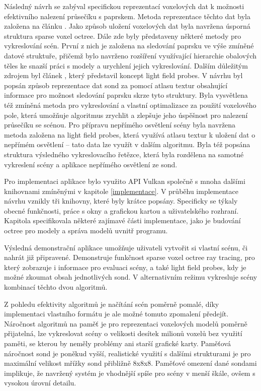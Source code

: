 Následný návrh se zabýval specifickou reprezentací voxelových dat k možnosti efektivního nalezení průsečíku s paprskem. Metoda reprezentace těchto dat byla založena na článku \cite{Laine2011EfficientSV}. Jako způsob uložení voxelových dat byla navržena úsporná struktura sparse voxel octree. Dále zde byly představeny některé metody pro vykreslování scén. První z nich je založena na sledování paprsku ve výše zmíněné datové struktuře, přičemž bylo navrženo rozšíření využívající hierarchie obalových těles ke snazší práci s modely a urychlení jejich vykreslování. Dalším důležitým zdrojem byl článek \cite{light_field_probes}, který představil koncept light field probes. V návrhu byl popsán způsob reprezentace dat sond za pomocí atlasu textur obsahující informace pro možnost sledování paprsku skrze tyto struktury. Byla vysvětlena též zmíněná metoda pro vykreslování a vlastní optimalizace za použití voxelového pole, která umožňuje algoritmus zrychlit a zlepšuje jeho úspěšnost pro nalezení průsečíku se scénou. Pro přípravu nepřímého osvětlení scény byla navržena metoda založena na light field probes, která využívá atlasu textur k uložení dat o nepřímém osvětlení -- tato data lze využít v dalším algoritmu. Byla též popsána struktura výsledného vykreslovacího řetězce, která byla rozdělena na samotné vykreslení scény a aplikace nepřímého osvětlení ze sond.

Pro implementaci aplikace bylo využito API Vulkan společně s mnoha dalšími knihovnami zmíněnými v kapitole \ref{implementace}. V průběhu implementace návrhu vznikly tři knihovny, které byly krátce popsány. Specificky se týkaly obecné funkčnosti, práce s okny a grafickou kartou a uživatelského rozhraní. Kapitola specifikovala některé zajímavé části implementace, jako je budování octree pro modely a správa modelů uvnitř programu.

Výsledná demonstrační aplikace umožňuje uživateli vytvořit si vlastní scénu, či nahrát již připravené. Demonstruje funkčnost sparse voxel octree ray tracing, pro který zobrazuje i informace pro evaluaci scény, a také light field probes, kdy je možné zkoumat obsah jednotlivých sond. V alternativním režimu vykresluje scény kombinací těchto dvou algoritmů.

Z pohledu efektivity algoritmů je načítání scén poměrně pomalé, díky implementaci vlastního formátu je ale možné tomuto zpomalení předejít. Náročnost algoritmů na paměť je pro reprezentaci voxelových modelů poměrně přijatelná, lze vykreslovat scény o velikosti desítek milionů voxelů bez využití paměti, se kterou by neměly problémy ani starší grafické karty. Paměťová náročnost sond je poněkud vyšší, realistické využití s dalšími strukturami je pro maximální velikost mřížky sond přibližně 8x8x8. Paměťové omezení dané sondami implikuje, že navržený systém je vhodnější spíše pro scény v menší škále, ovšem s vysokou úrovní detailu.



